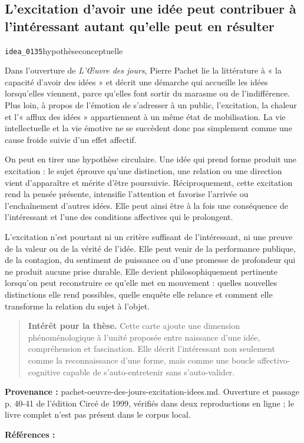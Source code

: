 \documentclass[10pt,a4paper]{article}
\begin{document}
\subsection{L'excitation d'avoir une idée peut contribuer à l'intéressant autant qu'elle peut en résulter}
{\small\color{metadata} \texttt{idea\_0135}\quad\textbullet\quad hypothèse\quad\textbullet\quad conceptuelle\par}

Dans l'ouverture de \emph{L'Œuvre des jours}, Pierre Pachet lie la littérature à « la capacité d'avoir des idées » et décrit une démarche qui accueille les idées lorsqu'elles viennent, parce qu'elles font sortir du marasme ou de l'indifférence. Plus loin, à propos de l'émotion de s'adresser à un public, l'excitation, la chaleur et l'« afflux des idées » appartiennent à un même état de mobilisation. La vie intellectuelle et la vie émotive ne se succèdent donc pas simplement comme une cause froide suivie d'un effet affectif.

On peut en tirer une hypothèse circulaire. Une idée qui prend forme produit une excitation : le sujet éprouve qu'une distinction, une relation ou une direction vient d'apparaître et mérite d'être poursuivie. Réciproquement, cette excitation rend la pensée présente, intensifie l'attention et favorise l'arrivée ou l'enchaînement d'autres idées. Elle peut ainsi être à la fois une conséquence de l'intéressant et l'une des conditions affectives qui le prolongent.

L'excitation n'est pourtant ni un critère suffisant de l'intéressant, ni une preuve de la valeur ou de la vérité de l'idée. Elle peut venir de la performance publique, de la contagion, du sentiment de puissance ou d'une promesse de profondeur qui ne produit aucune prise durable. Elle devient philosophiquement pertinente lorsqu'on peut reconstruire ce qu'elle met en mouvement : quelles nouvelles distinctions elle rend possibles, quelle enquête elle relance et comment elle transforme la relation du sujet à l'objet.

\begin{quote}
\textbf{Intérêt pour la thèse.} Cette carte ajoute une dimension phénoménologique à l'unité proposée entre naissance d'une idée, compréhension et fascination. Elle décrit l'intéressant non seulement comme la reconnaissance d'une forme, mais comme une boucle affectivo-cognitive capable de s'auto-entretenir sans s'auto-valider.
\end{quote}
{\footnotesize\color{metadata}\textbf{Provenance :} pachet-oeuvre-des-jours-excitation-idees.md. Ouverture et passage p. 40-41 de l'édition Circé de 1999, vérifiés dans deux reproductions en ligne ; le livre complet n'est pas présent dans le corpus local.\par}
{\footnotesize\color{metadata}\textbf{Références :} \parencite{pachet1999oeuvre}\par}
\end{document}
